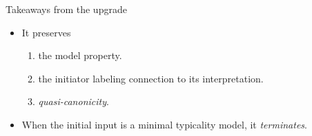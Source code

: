 \documentclass[10pt, xcolor=dvipsnames]{beamer}
\begin{document}
\begin{frame}{Takeaways from the upgrade}

  \large
  \begin{itemize}
    \item It preserves 
    \begin{enumerate}
      \item the model property. \pause
      \item the initiator labeling connection to its interpretation. \pause 
      \item \emph{quasi-canonicity}. \pause 
    \end{enumerate}
    \item When the initial input is a minimal typicality model, it \emph{terminates}.
  \end{itemize}

  
\end{frame}






    
    
\end{document}
